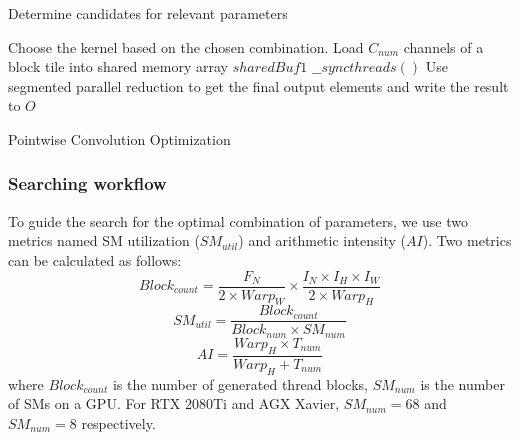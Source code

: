 \begin{algorithm}[t!]
    \small
        Determine candidates for relevant parameters\;

        Choose the kernel based on the chosen combination.\;
        Load $C_{num}$ channels of a block tile into shared memory array $sharedBuf1$\;
        $\_\_syncthreads()$\;
        Use segmented parallel reduction to get the final output elements and write the result to $O$\;
        \caption{Pointwise Convolution Optimization}
        \label{algo:pwalgo}
\end{algorithm}
\subsubsection{Searching workflow}
To guide the search for the optimal combination of parameters, we use two metrics named SM utilization ($SM_{util}$) and arithmetic intensity ($AI$).
Two metrics can be calculated as follows:
\begin{equation}\nonumber
    Block_{count}=\frac{F_N}{2 \times Warp_W} \times \frac{I_N \times I_H \times I_W}{2 \times Warp_H}
\end{equation}
\begin{equation}
    SM_{util}=\frac{Block_{count}}{Block_{num}\times SM_{num}}
    \label{fo:smutil}
\end{equation}
\begin{equation}
    AI = \frac{Warp_H \times T_{num}}{Warp_H+T_{num}}
    \label{fo:diff}
\end{equation}
where $Block_{count}$ is the number of generated thread blocks, $SM_{num}$ is the number of SMs on a GPU. For RTX 2080Ti and AGX Xavier, $SM_{num}=68$ and $SM_{num}=8$ respectively.

